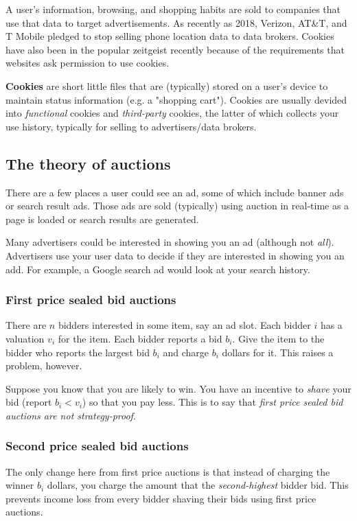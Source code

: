 \documentclass[titlepage, 12pt, leqno]{article}
\begin{document}
A user's information, browsing, and shopping habits are sold to companies that
use that data to target advertisements. As recently as 2018, Verizon, AT\&T, and T
Mobile pledged to stop selling phone location data to data brokers. Cookies have
also been in the popular zeitgeist recently because of the requirements that
websites ask permission to use cookies.

\begin{definition}
    \textbf{Cookies }are short little files that are (typically) stored on a
    user's device to maintain status information (e.g. a "shopping cart"). 
    Cookies are usually devided into \textit{functional }cookies and
    \textit{third-party} cookies, the latter of which collects your use history,
    typically for selling to advertisers/data brokers.
\end{definition}

\subsection{The theory of auctions}

There are a few places a user could see an ad, some of which include banner ads or
search result ads. Those ads are sold (typically) using auction in real-time as
a page is loaded or search results are generated.

Many advertisers could be interested in showing you an ad (although not 
\textit{all}). Advertisers use your user data to decide if they are interested in
showing you an add. For example, a Google search ad would look at your search 
history.

\subsubsection{First price sealed bid auctions}
There are $n$ bidders interested in some item, say an ad slot. Each bidder $i$
has a valuation $v_{i}$ for the item. Each bidder reports a bid $b_{i}$. Give the
item to the bidder who reports the largest bid $b_{i}$ and charge $b_{i}$ dollars
for it. This raises a problem, however.

Suppose you know that you are likely to win. You have an incentive to 
\textit{shave} your bid (report $b_{i} < v_{i}$) so that you pay less. This is to
say that \textit{first price sealed bid auctions are not strategy-proof}.

\subsubsection{Second price sealed bid auctions}
The only change here from first price auctions is that instead of charging the
winner $b_{i}$ dollars, you charge the amount that the \textit{second-highest}
bidder bid. This prevents income loss from every bidder shaving their bids using
first price auctions.
\end{document}
